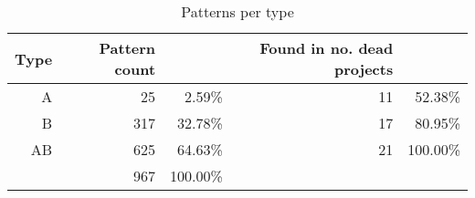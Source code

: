 \begin{table}[H]
\caption{Patterns per type}\label{table:pattern_type_counts}
\centering
\begin{tabular}{rrr rr}
\hline
	\bfseries{Type} & \bfseries{Pattern count} & & \bfseries{Found in
	no. dead projects} \\
	\hline
	A & 25 & 2.59\% & 11 & 52.38\% \\
	B & 317 & 32.78\% & 17 & 80.95\% \\
	AB & 625 & 64.63\% & 21 & 100.00\% \\
	\hline
	 & 967 & 100.00\% & \\
\hline
\end{tabular}
\end{table}
